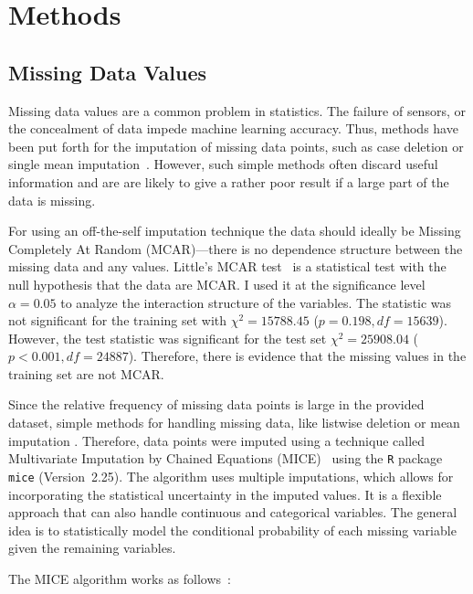 \documentclass{article}
\begin{document}
\section{Methods}
\label{sec:methods}

\subsection{Missing Data Values}

Missing data values are a common problem in statistics. The failure of
sensors, or the concealment of data impede machine learning
accuracy. Thus, methods have been put forth for the imputation of
missing data points, such as case deletion or single mean
imputation~\cite{schafer2002missing}. However, such simple methods
often discard useful information and are are likely to give a rather
poor result if a large part
of the data is missing.

For using an off-the-self imputation technique the data should ideally be Missing Completely At Random (MCAR)---there is no dependence structure between the missing data and any values. Little's MCAR test~\cite{little1988test} is a statistical test with the null hypothesis that the data are MCAR. I used it at the significance level $\alpha=0.05$ to analyze the interaction structure of the variables. The statistic was not significant for the training set with $\chi^2 = 15788.45$ ($p = 0.198, df=15639$).  However, the test statistic was significant for the test set $\chi^2 = 25908.04$ ($p < 0.001, df = 24887$). Therefore, there is evidence that the missing values in the training set are not MCAR.

Since the relative frequency of missing data points is large in the provided dataset,
simple methods for handling missing data, like listwise deletion or mean imputation . Therefore, data points were imputed using a technique called
Multivariate Imputation by Chained Equations
(MICE)~\cite{buuren2011mice} using the \texttt{R} package
\texttt{mice} (Version~2.25). The algorithm uses multiple imputations,
which allows for incorporating the statistical uncertainty in the
imputed values. It is a flexible approach that can also handle
continuous and categorical variables. The general idea is to statistically model the
conditional probability of each missing variable given the remaining
variables.

The MICE algorithm works as follows~\cite{azur2011multiple}:
\end{document}
